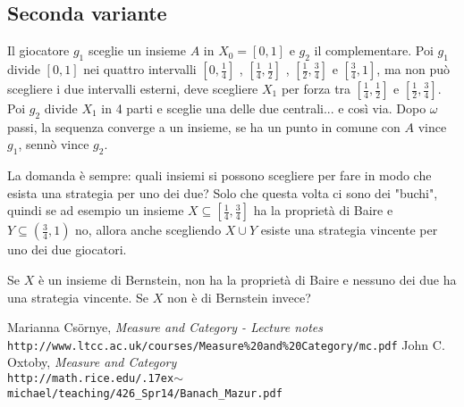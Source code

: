 \documentclass[10pt]{article}
\theoremstyle{definition}
\begin{document}
\subsection{Seconda variante}

Il giocatore $g_1$ sceglie un insieme $A$ in $X_0=[0,1]$ e $g_2$ il complementare.
Poi $g_1$ divide $[0,1]$ nei quattro intervalli $\left[0,\frac14\right]$ , $\left[\frac14,\frac12\right]$ , $\left[\frac12,\frac34\right]$ e $\left[\frac34,1\right]$, ma non può scegliere i due intervalli esterni, deve scegliere $X_1$ per forza tra $\left[\frac14,\frac12\right]$ e $\left[\frac12,\frac34\right]$.
Poi $g_2$ divide $X_1$ in 4 parti e sceglie una delle due centrali... e così via.
Dopo $\omega$ passi, la sequenza converge a un insieme, se ha un punto in comune con $A$ vince $g_1$, sennò vince $g_2$.

La domanda è sempre: quali insiemi si possono scegliere per fare in modo che esista una strategia per uno dei due? Solo che questa volta ci sono dei "buchi", quindi se ad esempio un insieme $X\subseteq\left[\frac14,\frac34\right]$ ha la proprietà di Baire e $Y\subseteq\left(\frac34,1\right)$ no, allora anche scegliendo $X\cup Y$ esiste una strategia vincente per uno dei due giocatori.

Se $X$ è un insieme di Bernstein, non ha la proprietà di Baire e nessuno dei due ha una strategia vincente. Se $X$ non è di Bernstein invece?

\begin{thebibliography}{1}
Marianna Cs\"ornye, \emph{Measure and Category - Lecture notes} \\
\texttt{http://www.ltcc.ac.uk/courses/Measure\%20and\%20Category/mc.pdf}
John C. Oxtoby, \emph{Measure and Category} \\
\texttt{http://math.rice.edu/{\raise.17ex\hbox{$\scriptstyle\mathtt{\sim}$}}michael/teaching/426\_Spr14/Banach\_Mazur.pdf}
\end{thebibliography}
\end{document}
